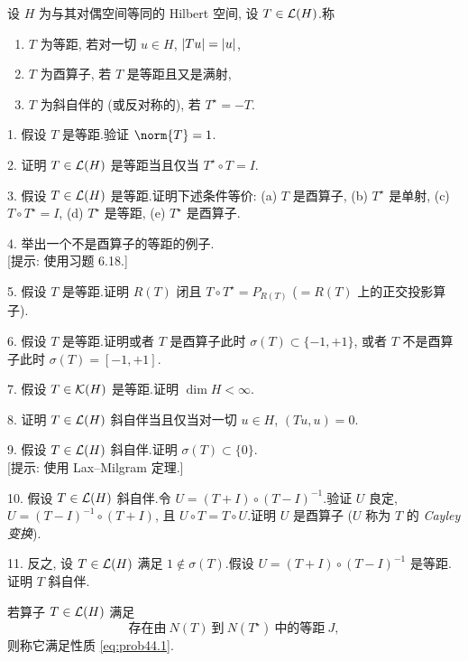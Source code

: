 \begin{problem}[第 5, 6 章]
\label{prob:44}
设 $H$ 为与其对偶空间等同的 Hilbert 空间, 设 $T\in\mathcal{L}(H)$.称
\begin{enumerate}[label=(\roman*), itemsep=0.1em]
	\item $T$ 为等距, 若对一切 $u\in H$, $\left|Tu\right|=\left|u\right|$,
	\item $T$ 为酉算子, 若 $T$ 是等距且又是满射,
	\item $T$ 为斜自伴的 (或反对称的), 若 $T^\star=-T$.
\end{enumerate}


1. 假设 $T$ 是等距.验证 $\norm{T}=1$.

2. 证明 $T\in\mathcal{L}(H)$ 是等距当且仅当 $T^\star\circ T=I$.

3. 假设 $T\in\mathcal{L}(H)$ 是等距.证明下述条件等价:
(a) $T$ 是酉算子,
(b) $T^\star$ 是单射,
(c) $T\circ T^\star=I$,
(d) $T^\star$ 是等距,
(e) $T^\star$ 是酉算子.

4. 举出一个不是酉算子的等距的例子.\\
{[提示: 使用习题 6.18.]}

5. 假设 $T$ 是等距.证明 $R(T)$ 闭且 $T\circ T^\star=P_{R(T)}$ ($=R(T)$ 上的正交投影算子).

6. 假设 $T$ 是等距.证明或者 $T$ 是酉算子此时 $\sigma(T)\subset\{-1,+1\}$, 或者 $T$ 不是酉算子此时 $\sigma(T)=[-1,+1]$.

7. 假设 $T\in\mathcal{K}(H)$ 是等距.证明 $\dim H<\infty$.

8. 证明 $T\in\mathcal{L}(H)$ 斜自伴当且仅当对一切 $u\in H$, $(Tu,u)=0$.

9. 假设 $T\in\mathcal{L}(H)$ 斜自伴.证明 $\sigma(T)\subset\{0\}$.\\
{[提示: 使用 Lax--Milgram 定理.]}

10. 假设 $T\in\mathcal{L}(H)$ 斜自伴.令 $U=(T+I)\circ(T-I)^{-1}$.验证 $U$ 良定,
$U=(T-I)^{-1}\circ(T+I)$, 且 $U\circ T=T\circ U$.证明 $U$ 是酉算子 ($U$ 称为 $T$
的 \emph{Cayley 变换}).

11. 反之, 设 $T\in\mathcal{L}(H)$ 满足 $1\notin\sigma(T)$.假设 $U=(T+I)\circ(T-I)^{-1}$
是等距.证明 $T$ 斜自伴.


若算子 $T\in\mathcal{L}(H)$ 满足
\begin{equation}
\text{存在由}\ N(T)\ \text{到}\ N(T^\star)\ \text{中的等距}\ J,
\tag{1}
\label{eq:prob44.1}
\end{equation}
则称它满足性质 \eqref{eq:prob44.1}.


\end{problem}
